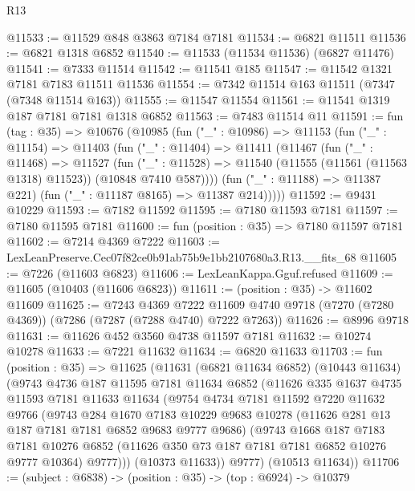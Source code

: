 \begin{lexlean}{R13}
\begin{coremodule}
@11533 := @11529 @848 @3863 @7184 @7181
@11534 := @6821 @11511
@11536 := @6821 @1318 @6852
@11540 := @11533 (@11534 @11536) (@6827 @11476)
@11541 := @7333 @11514
@11542 := @11541 @185
@11547 := @11542 @1321 @7181 @7183 @11511 @11536
@11554 := @7342 @11514 @163 @11511 (@7347 (@7348 @11514 @163))
@11555 := @11547 @11554
@11561 := @11541 @1319 @187 @7181 @7181 @1318 @6852
@11563 := @7483 @11514 @11
@11591 := fun (tag : @35) =>
  @10676
    (@10985
      (fun ("_" : @10986) =>
      @11153
        (fun ("_" : @11154) =>
        @11403
          (fun ("_" : @11404) =>
          @11411
            (@11467
              (fun ("_" : @11468) =>
              @11527
                (fun ("_" : @11528) =>
                @11540 (@11555 (@11561 (@11563 @1318) @11523)) (@10848 @7410 @587))))
            (fun ("_" : @11188) => @11387 @221)
            (fun ("_" : @11187 @8165) => @11387 @214)))))
@11592 := @9431 @10229
@11593 := @7182 @11592
@11595 := @7180 @11593 @7181
@11597 := @7180 @11595 @7181
@11600 := fun (position : @35) => @7180 @11597 @7181
@11602 := @7214 @4369 @7222
@11603 := LexLeanPreserve.Cec07f82ce0b91ab75b9e1bb2107680a3.R13.__fits_68
@11605 := @7226 (@11603 @6823)
@11606 := LexLeanKappa.Gguf.refused
@11609 := @11605 (@10403 (@11606 @6823))
@11611 := (position : @35) -> @11602 @11609
@11625 := @7243
    @4369
    @7222
    @11609
    @4740
    @9718
    (@7270 (@7280 @4369))
    (@7286 (@7287 (@7288 @4740) @7222 @7263))
@11626 := @8996 @9718
@11631 := @11626 @452 @3560 @4738 @11597 @7181
@11632 := @10274 @10278
@11633 := @7221 @11632
@11634 := @6820 @11633
@11703 := fun (position : @35) =>
  @11625
    (@11631
      (@6821 @11634 @6852)
      (@10443 @11634)
      (@9743
        @4736
        @187
        @11595
        @7181
        @11634
        @6852
        (@11626
          @335
          @1637
          @4735
          @11593
          @7181
          @11633
          @11634
          (@9754
            @4734
            @7181
            @11592
            @7220
            @11632
            @9766
            (@9743
              @284
              @1670
              @7183
              @10229
              @9683
              @10278
              (@11626 @281 @13 @187 @7181 @7181 @6852 @9683 @9777 @9686)
              (@9743
                @1668
                @187
                @7183
                @7181
                @10276
                @6852
                (@11626 @350 @73 @187 @7181 @7181 @6852 @10276 @9777 @10364)
                @9777)))
          (@10373 @11633))
        @9777)
      (@10513 @11634))
@11706 := (subject : @6838) -> (position : @35) -> (top : @6924) -> @10379

\end{coremodule}
\end{lexlean}
